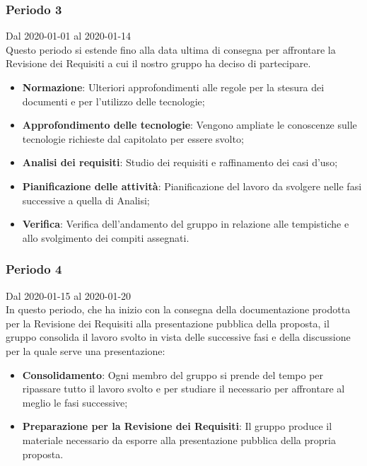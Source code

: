 \subsubsection{Periodo 3}
Dal 2020-01-01 al 2020-01-14\\
Questo periodo si estende fino alla data ultima di consegna per affrontare la Revisione dei Requisiti a cui il nostro gruppo ha deciso di partecipare.
\begin{itemize}
	\item \textbf{Normazione}: Ulteriori approfondimenti alle regole per la stesura dei documenti e per l'utilizzo delle tecnologie;
	\item \textbf{Approfondimento delle tecnologie}: Vengono ampliate le conoscenze sulle tecnologie richieste dal capitolato per essere svolto;
	\item \textbf{Analisi dei requisiti}: Studio dei requisiti e raffinamento dei casi d'uso;
	\item \textbf{Pianificazione delle attività}: Pianificazione del lavoro da svolgere nelle fasi successive a quella di Analisi;
	\item \textbf{Verifica}: Verifica dell'andamento del gruppo in relazione alle tempistiche e allo svolgimento dei compiti assegnati.
\end{itemize}

\subsubsection{Periodo 4} 
Dal 2020-01-15 al 2020-01-20\\
In questo periodo, che ha inizio con la consegna della documentazione prodotta per la Revisione dei Requisiti alla presentazione pubblica della proposta, il gruppo consolida il lavoro svolto in vista delle successive fasi e della discussione per la quale serve una presentazione:
\begin{itemize}
	\item \textbf{Consolidamento}: Ogni membro del gruppo si prende del tempo per ripassare tutto il lavoro svolto e per studiare il necessario per affrontare al meglio le fasi successive;
	\item \textbf{Preparazione per la Revisione dei Requisiti}: Il gruppo produce il materiale necessario da esporre alla presentazione pubblica della propria proposta.
\end{itemize}

